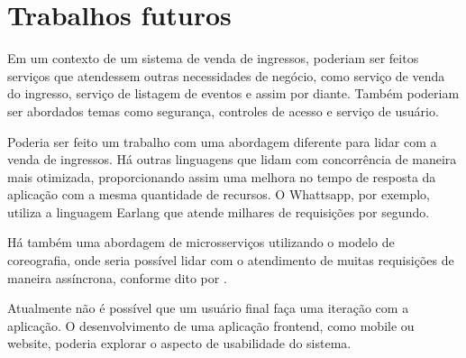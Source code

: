 
\chapter*[Trabalhos futuros]{Trabalhos futuros}\label{trabalhos-futuros}



Em um contexto de um sistema de venda de ingressos, poderiam ser feitos serviços que atendessem
outras necessidades de negócio, como serviço de venda do ingresso, serviço de listagem de eventos
e assim por diante.
Também poderiam ser abordados temas como segurança, controles de acesso e serviço de usuário.

Poderia ser feito um trabalho com uma abordagem diferente para lidar com a venda de ingressos.
Há outras linguagens que lidam com concorrência de maneira mais otimizada,
proporcionando assim uma melhora no tempo de resposta da aplicação com a mesma quantidade
de recursos.
O Whattsapp, por exemplo, utiliza a linguagem Earlang  que
atende milhares de requisições por segundo.

Há também uma abordagem de microsserviços utilizando o modelo de coreografia, onde seria possível
lidar com o atendimento de muitas requisições de maneira assíncrona, conforme dito por
\cite{scaling-microservices-event-stream}.

Atualmente não é possível que um usuário final faça uma iteração com a aplicação. O desenvolvimento
de uma aplicação frontend, como mobile ou website, poderia explorar o aspecto de usabilidade
do sistema.
